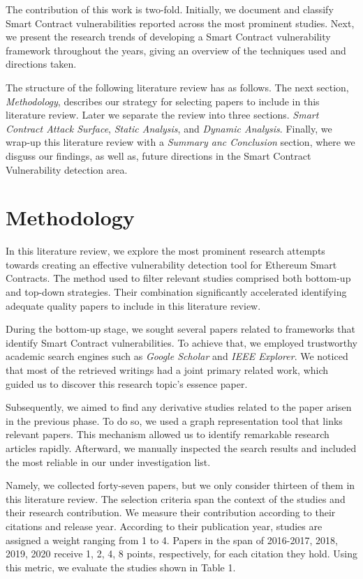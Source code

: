 \documentclass[a4paper,11pt]{article}
\begin{document}
The contribution of this work is two-fold. Initially, we document and classify
Smart Contract vulnerabilities reported across the most prominent studies. Next,
we present the research trends of developing a Smart Contract vulnerability
framework throughout the years, giving an overview of the techniques used and
directions taken.

The structure of the following literature review has as follows. The next
section, \emph{Methodology}, describes our strategy for selecting papers to
include in this literature review. Later we separate the review into three
sections. \emph{Smart Contract Attack Surface}, \emph{Static Analysis}, and
\emph{Dynamic Analysis}. Finally, we wrap-up this literature review with a
\emph{Summary anc Conclusion} section, where we disguss our findings, as well
as, future directions in the Smart Contract Vulnerability detection area.

\section{Methodology}

In this literature review, we explore the most prominent research attempts
towards creating an effective vulnerability detection tool for Ethereum Smart
Contracts. The method used to filter relevant studies comprised both bottom-up
and top-down strategies. Their combination significantly accelerated identifying
adequate quality papers to include in this literature review.

During the bottom-up stage, we sought several papers related to frameworks that
identify Smart Contract vulnerabilities. To achieve that, we employed
trustworthy academic search engines such as \emph{Google Scholar} and \emph{IEEE
Explorer}. We noticed that most of the retrieved writings had a joint primary
related work, which guided us to discover this research topic's essence
paper\cite{luu2016making}. 

Subsequently, we aimed to find any derivative studies related to the paper
arisen in the previous phase. To do so, we used a graph representation
tool\cite{connectedpapers} that links relevant papers. This mechanism allowed us
to identify remarkable research articles rapidly. Afterward, we manually
inspected the search results and included the most reliable in our under
investigation list.

Namely, we collected forty-seven papers, but we only consider thirteen of them
in this literature review. The selection criteria span the context of the
studies and their research contribution. We measure their contribution according
to their citations and release year. According to their publication year,
studies are assigned a weight ranging from 1 to 4. Papers in the span of
2016-2017, 2018, 2019, 2020  receive 1, 2, 4, 8 points, respectively, for each
citation they hold. Using this metric, we evaluate the studies shown in Table
1.
\end{document}
